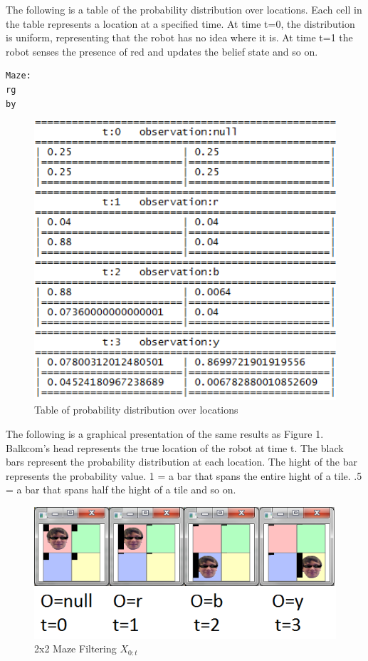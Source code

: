 \documentclass[a4paper]{article}
\begin{document}
The following is a table of the probability distribution over locations. Each cell in the table represents a location at a specified time. At time t=0, the distribution is uniform, representing that the robot has no idea where it is. At time t=1 the robot senses the presence of red and updates the belief state and so on.

\lstset{
numbers=none
}
\begin{lstlisting}
Maze:
rg
by

\end{lstlisting}

\begin{figure}[H]
\centering
\includegraphics[width=1\textwidth]{2x2Filtertext.png}
\caption{\label{fig:2x2 maze}Table of probability distribution over locations}
\end{figure}


The following is a graphical presentation of the same results as Figure 1. Balkcom's head represents the true location of the robot at time t. The black bars represent the probability distribution at each location. The hight of the bar represents the probability value. 1 = a bar that spans the entire hight of a tile. .5 = a bar that spans half the hight of a tile and so on.

\begin{figure}[H]
\centering
\includegraphics[width=1\textwidth]{2x2Filter.png}
\caption{\label{fig:2x2 maze}2x2 Maze Filtering $X_{0:t}$}
\end{figure}
\end{document}
